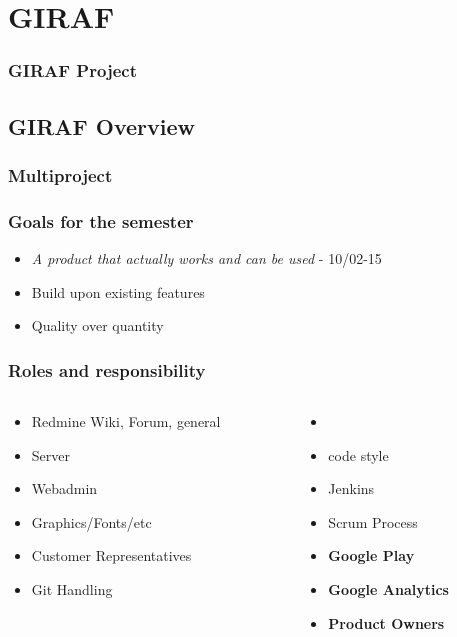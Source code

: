 \section{GIRAF}
\begin{frame}
	\frametitle{GIRAF Project}
\end{frame}

\subsection{GIRAF Overview}

\begin{frame}
  \begin{center}
	\frametitle{Multiproject}
  \end{center}
\end{frame}

\begin{frame}
	\begin{center}
		\frametitle{Goals for the semester}
		\begin{itemize}
			\item \textit{A product that actually works and can be used} - 10/02-15
			\item Build upon existing features
			\item Quality over quantity
		\end{itemize}
	\end{center}
\end{frame}

\begin{frame}
	\frametitle{Roles and responsibility}
	\begin{columns}[T] %
		\begin{column}{.48\textwidth}
			\begin{itemize}
				\item Redmine Wiki, Forum, general
				\item Server
				\item Webadmin
				\item Graphics/Fonts/etc
				\item Customer Representatives
				\item Git Handling
			\end{itemize}
		\end{column}%
		\hfill%
		\begin{column}{.48\textwidth}
			\begin{itemize}
				\item 
				\item code style
				\item Jenkins
				\item Scrum Process
				\item \textbf{Google Play}
				\item \textbf{Google Analytics}
				\item \textbf{Product Owners}
			\end{itemize}
		\end{column}%
	\end{columns}
\end{frame}

